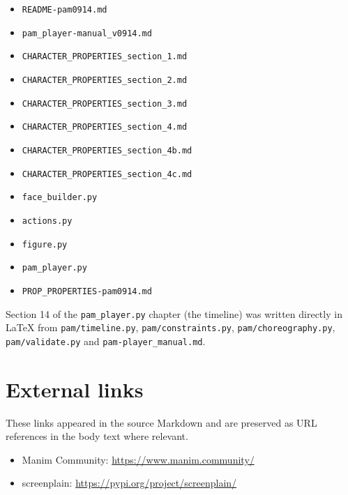\documentclass[
  12pt,
  letterpaper,
]{book}
\providecommand{\tightlist}{%
  \setlength{\itemsep}{0pt}\setlength{\parskip}{0pt}}
\begin{document}
\begin{itemize}
\tightlist
\item
  \texttt{README-pam0914.md}
\item
  \texttt{pam\_player-manual\_v0914.md}
\item
  \texttt{CHARACTER\_PROPERTIES\_section\_1.md}
\item
  \texttt{CHARACTER\_PROPERTIES\_section\_2.md}
\item
  \texttt{CHARACTER\_PROPERTIES\_section\_3.md}
\item
  \texttt{CHARACTER\_PROPERTIES\_section\_4.md}
\item
  \texttt{CHARACTER\_PROPERTIES\_section\_4b.md}
\item
  \texttt{CHARACTER\_PROPERTIES\_section\_4c.md}
\item
  \texttt{face\_builder.py}
\item
  \texttt{actions.py}
\item
  \texttt{figure.py}
\item
  \texttt{pam\_player.py}
\item
  \texttt{PROP\_PROPERTIES-pam0914.md}
\end{itemize}

Section 14 of the \texttt{pam\_player.py} chapter (the timeline) was
written directly in LaTeX from \texttt{pam/timeline.py},
\texttt{pam/constraints.py}, \texttt{pam/choreography.py},
\texttt{pam/validate.py} and
\texttt{pam-player\_manual.md}.

\section{External links}\label{external-links}

These links appeared in the source Markdown and are preserved as URL
references in the body text where relevant.

\begin{itemize}
\tightlist
\item
  Manim Community: \url{https://www.manim.community/}
\item
  screenplain: \url{https://pypi.org/project/screenplain/}
\end{itemize}

\printindex

\backmatter
\end{document}
